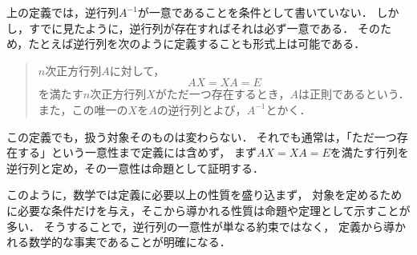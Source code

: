 \begin{remark}[定義は最小限にとどめる]
  上の定義では，逆行列$A^{-1}$が一意であることを条件として書いていない．
  しかし，すでに見たように，逆行列が存在すればそれは必ず一意である．
  そのため，たとえば逆行列を次のように定義することも形式上は可能である．

  \begin{quotation}
    $n$次正方行列$A$に対して，
    \[
      AX = XA = E
    \]
    を満たす$n$次正方行列$X$がただ一つ存在するとき，$A$は正則であるという．
    また，この唯一の$X$を$A$の逆行列とよび，$A^{-1}$とかく．
  \end{quotation}

  この定義でも，扱う対象そのものは変わらない．
  それでも通常は，「ただ一つ存在する」という一意性まで定義には含めず，
  まず$AX = XA = E$を満たす行列を逆行列と定め，その一意性は命題として証明する．

  このように，数学では定義に必要以上の性質を盛り込まず，
  対象を定めるために必要な条件だけを与え，そこから導かれる性質は命題や定理として示すことが多い．
  そうすることで，逆行列の一意性が単なる約束ではなく，
  定義から導かれる数学的な事実であることが明確になる．
\end{remark}

